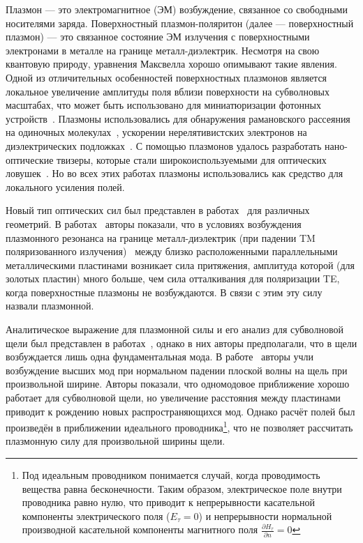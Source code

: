 Плазмон --- это электромагнитное (ЭМ) возбуждение, связанное со свободными носителями заряда. Поверхностный плазмон-поляритон (далее --- поверхностный плазмон) --- это связанное состояние ЭМ излучения с поверхностными электронами в металле на границе металл-диэлектрик. Несмотря на свою квантовую природу, уравнения Максвелла хорошо опимывают такие явления. Одной из отличительных особенностей поверхностных плазмонов является локальное увеличение амплитуды поля вблизи поверхности на субволновых масштабах, что может быть использовано для миниатюризации фотонных устройств~\cite{barnes2003surface}. Плазмоны использовались для обнаружения рамановского рассеяния на одиночных молекулах~\cite{PhysRevLett.78.1667}, ускорении нерелятивистских электронов на диэлектрических подложках~\cite{breuer2013laser}.
С помощью плазмонов удалось разработать нано-оптические твизеры, которые стали широкоиспользуемыми для оптических ловушек~\cite{juan2011plasmon,xu2002surface}. Но во всех этих работах плазмоны использовались как средство для локального усиления полей.

Новый тип оптических сил был представлен в работах~\cite{roels2009tunable,li2009tunable,dholakia2010colloquium,nesterov2011light,Frumin11} для различных геометрий. В работах~\cite{nesterov2011light,Frumin11} авторы показали, что в условиях возбуждения плазмонного резонанса на границе металл-диэлектрик (при падении TM поляризованного излучения)~\cite{zayats2005nano} между близко расположенными параллельными металлическими пластинами возникает сила притяжения, амплитуда которой (для золотых пластин) много больше, чем сила отталкивания для поляризации TE, когда поверхностные плазмоны не возбуждаются. В связи с этим эту силу назвали плазмонной. 

Аналитическое выражение для плазмонной силы и его анализ для субволновой щели был представлен в работах~\cite{nesterov2011light,Frumin11}, однако в них авторы предполагали, что в щели возбуждается лишь одна фундаментальная мода. В работе~\cite{Shapiro16} авторы учли возбуждение высших мод при нормальном падении плоской волны на щель при произвольной ширине. Авторы показали, что одномодовое приближение хорошо работает для субволновой щели, но увеличение расстояния между пластинами приводит к рождению новых распространяющихся мод. Однако расчёт полей был произведён в приближении идеального проводника\footnote{Под идеальным проводником 
понимается случай, когда проводимость вещества равна бесконечности. Таким образом, электрическое поле внутри проводника равно нулю, что приводит к непрерывности касательной компоненты электрического поля ($E_{\tau} = 0$) и непрерывности нормальной производной касательной компоненты магнитного поля 
$\frac{\partial H_{\tau}}{\partial n} = 0$}, что не позволяет рассчитать плазмонную силу для произвольной ширины щели.


